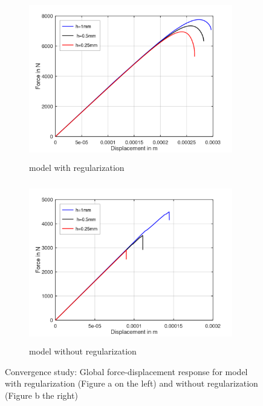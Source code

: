 \documentclass[12pt,twoside]{report}
\begin{document}
\begin{figure}[htbp!]
     \captionsetup[subfigure]{justification=centering}
     \begin{subfigure}{0.45\textwidth}
         \includegraphics[width=8.9cm,height=7cm]{25.FvsD.png}
         \caption{model with regularization}
         \label{fig:with regularization}
     \end{subfigure}
     \hspace{1.5cm}
     \begin{subfigure}{0.45\textwidth}
         \includegraphics[width=8.9cm,height=7cm]{25.FvsD2.png}
         \caption{model without regularization}
         \label{fig:without regularization}
     \end{subfigure}
    \caption{Convergence study: Global force-displacement response for model with regularization (Figure a on the left) and without regularization (Figure b the right) }
    \label{fig:Convergence study}
\end{figure}
\FloatBarrier
 
\end{document}
